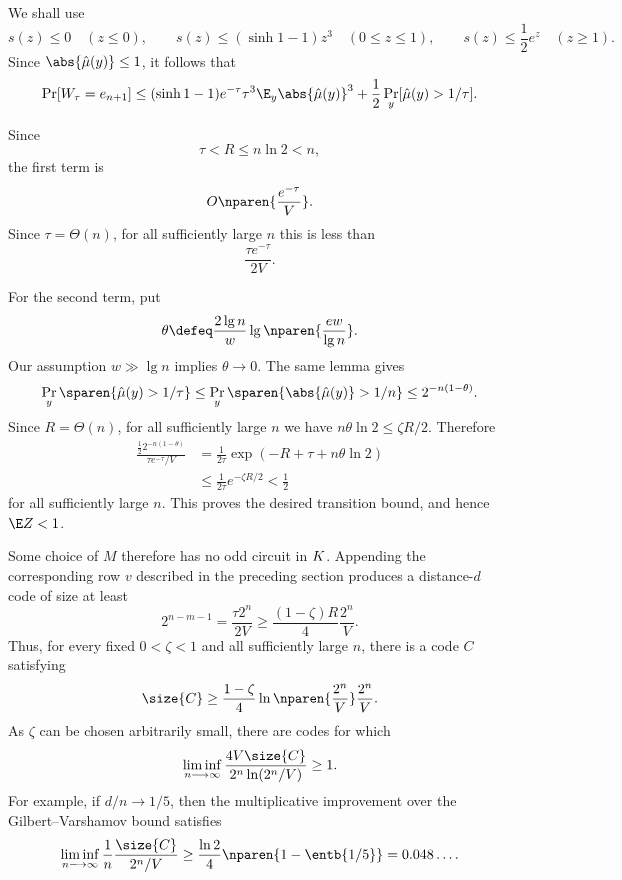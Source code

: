 We shall use
$$
s(z)\le0\quad(z\le0),
\qquad
s(z)\le(\sinh1-1)z^3\quad(0\le z\le1),
\qquad
s(z)\le\frac12e^z\quad(z\ge1).
$$
Since $\abs{\hat\mu(y)}\le1$, it follows that
$$
\Pr[W_\tau=e_{n+1}]
\le
(\sinh1-1)e^{-\tau}\tau^3
\E_y\abs{\hat\mu(y)}^3
+
\frac12\Pr_y[\hat\mu(y)>1/\tau].
$$

Since
$$
\tau<R\le n\ln2<n,
$$
the first term is
$$
O\nparen{\frac{e^{-\tau}}V}.
$$
Since $\tau=\Theta(n)$, for all sufficiently large $n$ this is
less than
$$
\frac{\tau e^{-\tau}}{2V}.
$$

For the second term, put
$$
\theta\defeq
\frac{2\lg n}{w}\lg\nparen{\frac{ew}{\lg n}}.
$$
Our assumption $w\gg\lg n$ implies $\theta\longrightarrow0$.
The same lemma gives
$$
\Pr_y\sparen{\hat\mu(y)>1/\tau}
\le
\Pr_y\sparen{\abs{\hat\mu(y)}>1/n}
\le2^{-n(1-\theta)}.
$$
Since $R=\Theta(n)$, for all sufficiently large $n$ we have
$n\theta\ln2\le\zeta R/2$.  Therefore
$$
\begin{aligned}
\frac{\frac12 2^{-n(1-\theta)}}
     {\tau e^{-\tau}/V}
&=
\frac1{2\tau}
\exp\left(-R+\tau+n\theta\ln2\right)\\
&\le
\frac1{2\tau}e^{-\zeta R/2}
<\frac12
\end{aligned}
$$
for all sufficiently large $n$.  This proves
the desired transition bound, and hence $\E Z<1$.

Some choice of $M$ therefore has no odd circuit in $K$.
Appending the corresponding row $v$ described in the preceding
section produces a distance-$d$ code of size at least
$$
2^{n-m-1}
=\frac{\tau2^n}{2V}
\ge
\frac{(1-\zeta)R}{4}\frac{2^n}{V}.
$$
Thus, for every fixed $0<\zeta<1$ and all sufficiently large $n$,
there is a code $C$ satisfying
$$
\size{C}
\ge
\frac{1-\zeta}{4}
\ln\nparen{\frac{2^n}{V}}\frac{2^n}{V}.
$$
As $\zeta$ can be chosen arbitrarily small, there are codes for
which
$$
\liminf_{n\longrightarrow\infty}
\frac{4V\size{C}}{2^n\ln(2^n/V)}\ge1.
$$
For example, if $d/n\longrightarrow1/5$, then the multiplicative
improvement over the Gilbert--Varshamov bound satisfies
$$
\liminf_{n\longrightarrow\infty}
\frac1n\frac{\size{C}}{2^n/V}
\ge
\frac{\ln2}{4}\nparen{1-\entb{1/5}}
=0.048\ldots.
$$

